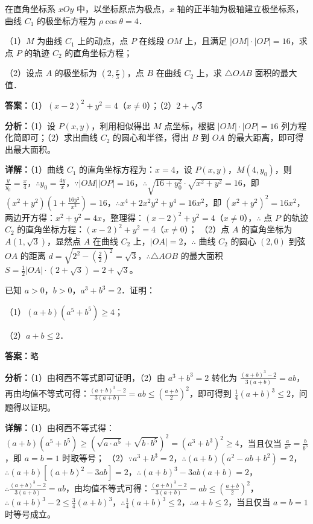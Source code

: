 \begin{question}[points=10]
[选修4-4：坐标系与参数方程]

在直角坐标系 $xOy$ 中，以坐标原点为极点，$x$ 轴的正半轴为极轴建立极坐标系，曲线 $C_1$ 的极坐标方程为 $\rho\cos\theta=4$．

（1）$M$ 为曲线 $C_1$ 上的动点，点 $P$ 在线段 $OM$ 上，且满足 $|OM|\cdot|OP|=16$，求点 $P$ 的轨迹 $C_2$ 的直角坐标方程；

（2）设点 $A$ 的极坐标为 $(2,\frac{\pi}{3})$，点 $B$ 在曲线 $C_2$ 上，求 $\triangle OAB$ 面积的最大值．
\begin{solution}
\textbf{答案：}（1）$(x-2)^2+y^2=4$（$x\neq0$）；（2）$2+\sqrt{3}$

\textbf{分析：}（1）设 $P(x,y)$，利用相似得出 $M$ 点坐标，根据 $|OM|\cdot|OP|=16$ 列方程化简即可；（2）求出曲线 $C_2$ 的圆心和半径，得出 $B$ 到 $OA$ 的最大距离，即可得出最大面积。

\textbf{详解：}（1）曲线 $C_1$ 的直角坐标方程为：$x=4$，设 $P(x,y)$，$M(4,y_0)$，则 $\frac{y}{y_0}=\frac{x}{4}$，$\therefore y_0=\frac{4y}{x}$，$\because|OM||OP|=16$，$\therefore\sqrt{16+y_0^2}\cdot\sqrt{x^2+y^2}=16$，即 $(x^2+y^2)(1+\frac{16y^2}{x^2})=16$，$\therefore x^4+2x^2y^2+y^4=16x^2$，即 $(x^2+y^2)^2=16x^2$，两边开方得：$x^2+y^2=4x$，整理得：$(x-2)^2+y^2=4$（$x\neq0$），$\therefore$ 点 $P$ 的轨迹 $C_2$ 的直角坐标方程：$(x-2)^2+y^2=4$（$x\neq0$）；
（2）点 $A$ 的直角坐标为 $A(1,\sqrt{3})$，显然点 $A$ 在曲线 $C_2$ 上，$|OA|=2$，$\therefore$ 曲线 $C_2$ 的圆心 $(2,0)$ 到弦 $OA$ 的距离 $d=\sqrt{2^2-(\frac{2}{2})^2}=\sqrt{3}$，$\therefore\triangle AOB$ 的最大面积 $S=\frac{1}{2}|OA|\cdot(2+\sqrt{3})=2+\sqrt{3}$。
\end{solution}
\end{question}

\begin{question}[points=10]
[选修4-5：不等式选讲]

已知 $a>0$，$b>0$，$a^3+b^3=2$．证明：

（1）$(a+b)(a^5+b^5)\ge4$；

（2）$a+b\le2$．
\begin{solution}
\textbf{答案：}略

\textbf{分析：}（1）由柯西不等式即可证明，（2）由 $a^3+b^3=2$ 转化为 $\frac{(a+b)^3-2}{3(a+b)}=ab$，再由均值不等式可得：$\frac{(a+b)^3-2}{3(a+b)}=ab\le(\frac{a+b}{2})^2$，即可得到 $\frac{1}{4}(a+b)^3\le2$，问题得以证明。

\textbf{详解：}（1）由柯西不等式得：$(a+b)(a^5+b^5)\ge(\sqrt{a\cdot a^5}+\sqrt{b\cdot b^5})^2=(a^3+b^3)^2\ge4$，当且仅当 $\frac{a}{a^5}=\frac{b}{b^5}$，即 $a=b=1$ 时取等号；
（2）$\because a^3+b^3=2$，$\therefore(a+b)(a^2-ab+b^2)=2$，$\therefore(a+b)[(a+b)^2-3ab]=2$，$\therefore(a+b)^3-3ab(a+b)=2$，$\therefore\frac{(a+b)^3-2}{3(a+b)}=ab$，由均值不等式可得：$\frac{(a+b)^3-2}{3(a+b)}=ab\le(\frac{a+b}{2})^2$，$\therefore(a+b)^3-2\le\frac{3}{4}(a+b)^3$，$\therefore\frac{1}{4}(a+b)^3\le2$，$\therefore a+b\le2$，当且仅当 $a=b=1$ 时等号成立。
\end{solution}
\end{question}

